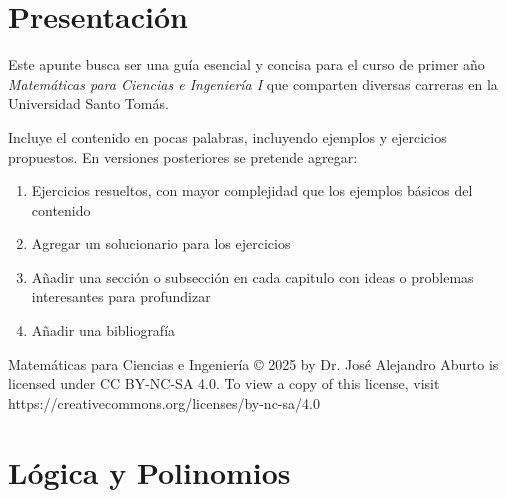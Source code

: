 \documentclass[12pt, twoside]{book}
\begin{document}

\restoregeometry
\nopagecolor

\tableofcontents

\chapter*{Presentación}
Este apunte busca ser una guía esencial y concisa para el curso de primer año \emph{Matemáticas para Ciencias e Ingeniería I} que comparten diversas carreras en la Universidad Santo Tomás.


Incluye el contenido en pocas palabras, incluyendo ejemplos y ejercicios propuestos. En versiones posteriores se pretende agregar:
\begin{enumerate}[label=\roman*)]
    \item Ejercicios resueltos, con mayor complejidad que los ejemplos básicos del contenido
    \item Agregar un solucionario para los ejercicios
    \item Añadir una sección o subsección en cada capitulo con ideas o problemas interesantes para profundizar
    \item Añadir una bibliografía
\end{enumerate}
\vfill
\noindent
Matemáticas para Ciencias e Ingeniería © 2025 by Dr. José Alejandro Aburto is licensed under CC BY-NC-SA 4.0. To view a copy of this license, visit https://creativecommons.org/licenses/by-nc-sa/4.0

\chapter{Lógica y Polinomios}
\end{document}
